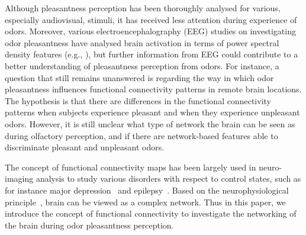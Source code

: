 Although pleasantness perception has been thoroughly analysed for various, especially audiovisual, stimuli, it has received less attention during experience of odors. Moreover, various electroencephalography (EEG) studies on investigating odor pleasantness have analysed brain activation in terms of power spectral density features (e.g., \cite{kroupi2012multivariate,joussain2013effect,kroupi2014eeg}), but further information from EEG could contribute to a better understanding of pleasantness perception from odors. For instance, a question that still remains unanswered is regarding the way in which odor pleasantness influences functional connectivity patterns in remote brain locations. The hypothesis is that there are differences in the functional connectivity patterns when subjects experience pleasant and when they experience unpleasant odors. However, it is still unclear what type of network the brain can be seen as during olfactory perception, and if there are network-based features able to discriminate pleasant and unpleasant odors. 


The concept of functional connectivity maps has been largely used in neuro-imaging analysis to study various disorders with respect to control states, such as for instance major depression~\cite{greicius2007resting} and epilepsy~\cite{waites2006functional}. Based on the neurophysiological principle~\cite{van2010exploring}, brain can be viewed as a complex network. Thus in this paper, we introduce the concept of functional connectivity to investigate the networking of the brain during odor pleasantness perception.

